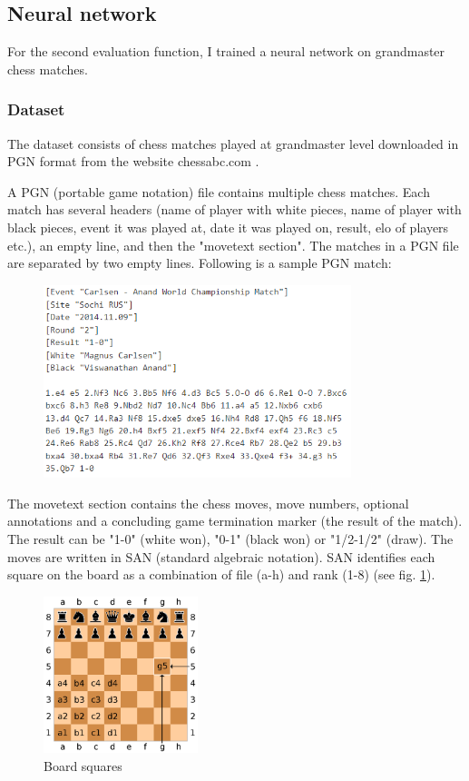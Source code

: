 \subsection{Neural network}
\label{subsec:ch4sec3subsec2}

For the second evaluation function, I trained a neural network on grandmaster chess matches.

\subsubsection{Dataset}
\label{subsec:ch4sec3subsec2subsubsec1}

The dataset consists of chess matches played at grandmaster level downloaded in PGN format from the website chessabc.com \cite{chessabc}.

A PGN (portable game notation) file contains multiple chess matches. Each match has several headers (name of player with white pieces, name of player with black pieces, event it was played at, date it was played on, result, elo of players etc.), an empty line, and then the "movetext section". The matches in a PGN file are separated by two empty lines. Following is a sample PGN match:
\begin{figure}[h]
    \includegraphics[width=0.8\textwidth]{figures/carlsen-anand-match.png}
\end{figure}

The movetext section contains the chess moves, move numbers, optional annotations and a concluding game termination marker (the result of the match). The result can be "1-0" (white won), "0-1" (black won) or "1/2-1/2" (draw). The moves are written in SAN (standard algebraic notation). SAN identifies each square on the board as a combination of file (a-h) and rank (1-8) (see fig. \ref{fig:boardSquares}).

\begin{figure}[h]
    \centering
    \includegraphics[width=0.4\textwidth]{figures/board-squares.png}
    \caption{Board squares}
    \label{fig:boardSquares}
\end{figure}


